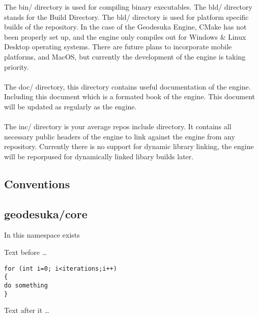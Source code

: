 \documentclass{book}
\begin{document}
The bin/ directory is used for compiling binary executables. \newline
The bld/ directory stands for the Build Directory. The bld/ directory is used for platform specific builds of the repository.
In the case of the Geodesuka Engine, CMake has not been properly set up, and the engine only compiles out for Windows \& Linux Desktop operating systems. There are future plans
to incorporate mobile platforms, and MacOS, but currently the development of the engine is taking priority. \\ \\ The doc/ directory, this directory contains useful documentation
of the engine. Including this document which is a formated book of the engine. This document will be updated as regularly as the engine. \\ \\ The inc/ directory is your average repos include directory.
It contains all necessary public headers of the engine to link against the engine from any repository. Currently there is no support for dynamic library linking, the engine will be reporpused for dynamically
linked libary builds later.
\subsection{Conventions}

\subsection{geodesuka/core}
In this namespace exists

Text before \dots
\begin{lstlisting}
for (int i=0; i<iterations;i++)
{
do something
}
\end{lstlisting}
Text after it \dots
\end{document}

